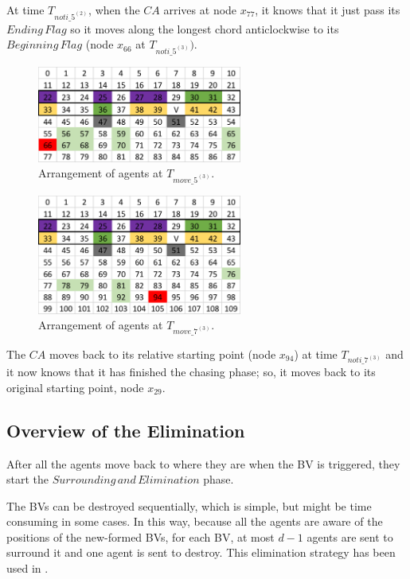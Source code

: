 At time $T_{noti\_5^{(2)}}$, when the $CA$ arrives at node $x_{77}$, it knows that it just pass its $Ending\,Flag$ so it moves along the longest chord anticlockwise to its $Beginning\,Flag$ (node $x_{66}$ at $T_{noti\_5^{(3)}})$.
\begin{figure}[H]
  \centering  
  \includegraphics[width=0.6\textwidth]{figures/T66.png}
  \caption{Arrangement of agents at $T_{move\_5^{(3)}}$. }\label{fig:T66}
\end{figure}

\begin{figure}[H]
  \centering  
  \includegraphics[width=0.6\textwidth]{figures/T94.png}
  \caption{Arrangement of agents at $T_{move\_7^{(3)}}$. }\label{fig:T94}
\end{figure}

The $CA$ moves back to its relative starting point (node $x_{94}$) at time  $T_{noti\_7^{(3)}}$ and it  now knows that it has finished the chasing phase; so, it  moves back to its original starting point,  node $x_{29}$.


\subsection{Overview of the Elimination}
After all the agents move back to where they are when the BV is triggered, they start the $Surrounding\,and\,Elimination$ phase. 

The BVs can be destroyed sequentially,  which is simple,  but might be time consuming in some cases. In this way, because all the agents are aware of the positions of the new-formed BVs,   for each BV,  at most $d-1$ agents are sent to surround it  and one agent is sent to destroy. This elimination strategy has been used in \cite{alotaibi}. 

